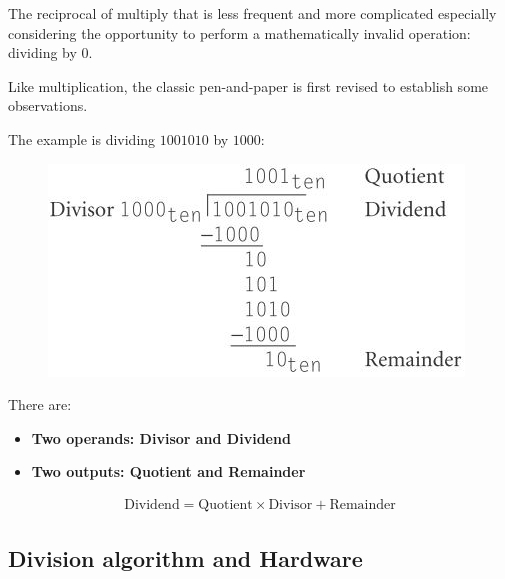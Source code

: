 \documentclass[10pt,a4paper]{article}
\begin{document}
The reciprocal of multiply that is less frequent and more complicated especially considering the opportunity to perform a mathematically invalid operation: dividing by 0.

Like multiplication, the classic pen-and-paper is first revised to establish some observations.

The example is dividing $1 001 010$ by $1000$: \par
\begin{figure} [h!]
    \centering
    \includegraphics[scale=0.7]{Long division.JPG}
\end{figure}
There are:
\begin{itemize}
    \item \textbf{Two operands: Divisor and Dividend}
    \item \textbf{Two outputs: Quotient and Remainder}
\end{itemize}  
\begin{align*}
    \text{Dividend} = \text{Quotient} \times \text{Divisor} + \text{Remainder}
\end{align*}

\subsection{Division algorithm and Hardware}
\end{document}
